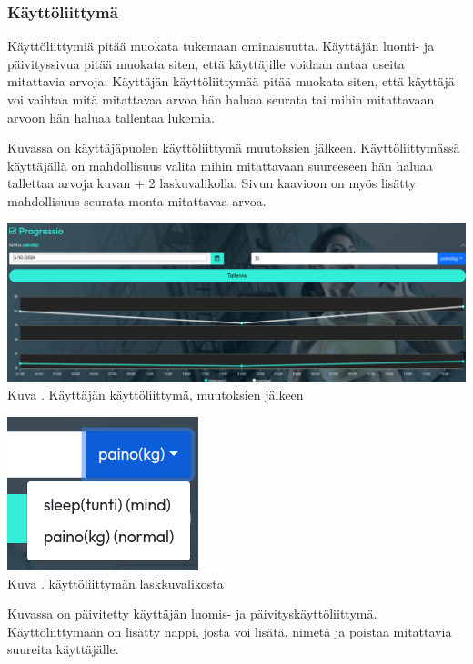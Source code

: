 \subsubsection{Käyttöliittymä}





Käyttöliittymiä pitää muokata tukemaan ominaisuutta.
Käyttäjän luonti- ja päivityssivua pitää muokata siten, että käyttäjille voidaan antaa useita mitattavia arvoja.
Käyttäjän käyttöliittymää pitää muokata siten,
että käyttäjä voi vaihtaa mitä mitattavaa arvoa hän haluaa seurata tai mihin mitattavaan arvoon hän haluaa tallentaa lukemia.
\medskip

Kuvassa \nextImageCount{} on käyttäjäpuolen käyttöliittymä muutoksien jälkeen.
Käyttöliittymässä käyttäjällä on mahdollisuus valita mihin mitattavaan suureeseen hän haluaa tallettaa arvoja kuvan {\the\numexpr \theimgCounter + 2 } laskuvalikolla.
Sivun kaavioon on myös lisätty mahdollisuus seurata monta mitattavaa arvoa.
\medskip

\bigskip
\includegraphics[width = 15cm]{src/public/progressmulti.png}\\
Kuva \getImgCount {}. Käyttäjän käyttöliittymä, muutoksien jälkeen 
\medskip

\bigskip
\includegraphics{src/public/progressselect.png}\\
Kuva \getImgCount {}. käyttöliittymän laskkuvalikosta
\medskip



Kuvassa \nextImageCount {} on päivitetty käyttäjän luomis- ja päivityskäyttöliittymä.
Käyttöliittymään on lisätty nappi, josta voi lisätä, nimetä ja poistaa mitattavia suureita käyttäjälle.
%

